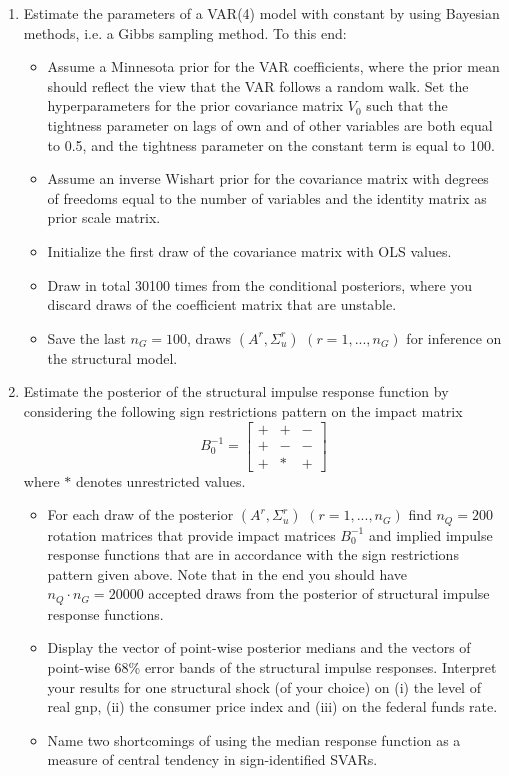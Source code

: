\documentclass{article}
\begin{document}
\begin{enumerate}
	\item Estimate the parameters of a VAR{(4)} model with constant by using Bayesian methods, i.e. a Gibbs sampling method. To this end:
	\begin{itemize}
		\item Assume a Minnesota prior for the VAR coefficients, where the prior mean should reflect the view that the VAR follows a random walk. Set the hyperparameters for the prior covariance matrix $V_0$ such that the tightness parameter on lags of own and of other variables are both equal to 0.5, and the tightness parameter on the constant term is equal to 100. 
		\item Assume an inverse Wishart prior for the covariance matrix with degrees of freedoms equal to the number of variables and the identity matrix as prior scale matrix.
		\item Initialize the first draw of the covariance matrix with OLS values.
		\item Draw in total 30100 times from the conditional posteriors, where you discard draws of the coefficient matrix that are unstable.
		\item Save the last $n_{G}=100$, draws $(A^{r},\Sigma_u^{r})$ $(r=1,...,n_G)$ for inference on the structural model.
	\end{itemize}
	\item Estimate the posterior of the structural impulse response function by considering the following sign restrictions pattern on the impact matrix
		$$ B_0^{-1}=\begin{bmatrix}
		+ & + & -\\
		+ & - & -\\
		+ & *  & +
		\end{bmatrix}$$
		 where $*$ denotes unrestricted values.
		 \begin{itemize}
			 \item For each draw of the posterior $(A^{r},\Sigma_u^{r})$ $(r=1,...,n_G)$ find $n_Q=200$ rotation matrices that provide impact matrices $B_0^{-1}$ and implied impulse response functions that are in accordance with the sign restrictions pattern given above. Note that in the end you should have $n_Q\cdot n_{G}=20000$ accepted draws from the posterior of structural impulse response functions.
			 \item Display the vector of point-wise posterior medians and the vectors of point-wise 68\% error bands of the structural impulse responses. Interpret your results for one structural shock (of your choice) on (i) the level of real gnp, (ii) the consumer price index and (iii) on the federal funds rate.
			 \item Name two shortcomings of using the median response function as a measure of central tendency in sign-identified SVARs.
		 \end{itemize}
\end{enumerate}
\newpage
\end{document}
